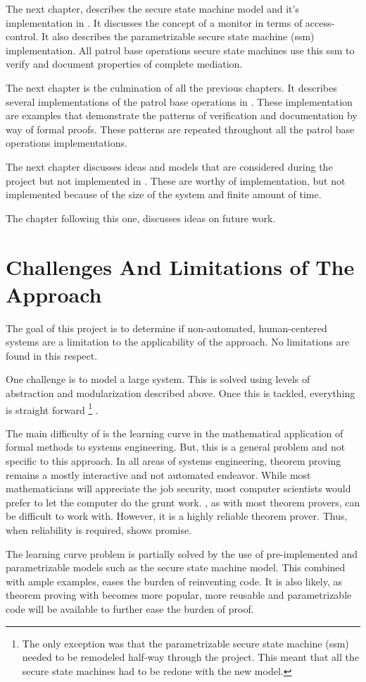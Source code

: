 \documentclass[../../main/main.tex]{subfiles}
\begin{document}
The next chapter, describes the secure state machine model and it's implementation in .  It discusses the concept of a monitor in terms of access-control.  It also describes the parametrizable secure state machine (ssm)   implementation. All patrol base operations secure state machines use this ssm to verify and document properties of complete mediation.

The next chapter is the culmination of all the previous chapters. It describes several implementations of the patrol base operations in .  These implementation are examples that demonstrate the patterns of verification and documentation by way of formal proofs.  These patterns are repeated throughout all the patrol base operations implementations.

The next chapter discusses ideas and models that are considered during the project but not implemented in .  These are worthy of implementation, but not implemented because of the size of the system and finite amount of time.  

The chapter following this one, discusses ideas on future work.  

\section{Challenges And Limitations of The Approach}\label{missionaccomplished}
The goal of this project is to determine if non-automated, human-centered systems are a limitation to the applicability of the  approach.  No limitations are found in this respect.  

One challenge is to model a large system.  This is solved using levels of abstraction and modularization described above.  Once this is tackled, everything is straight forward \footnote{The only exception was that the parametrizable secure state machine (ssm) needed to be remodeled half-way through the project.  This meant that all the secure state machines had to be redone with the new model.} .

The main difficulty of  is the learning curve in the mathematical application of formal methods to systems engineering.  But, this is a general problem and not specific to this approach. In all areas of systems engineering, theorem proving remains a mostly interactive and not automated endeavor.  While most mathematicians will appreciate the job security, most computer scientists would prefer to let the computer do the grunt work.  , as with most theorem provers,  can be difficult to work with.  However, it is a highly reliable theorem prover.  Thus, when reliability is required,  shows promise. 


The learning curve problem is partially solved by the use of pre-implemented and parametrizable models such as the secure state machine model.  This combined with ample examples, eases the burden of reinventing  code. It is also likely, as theorem proving with  becomes more popular, more reusable and parametrizable code will be available to further ease the burden of proof.  
\end{document}
